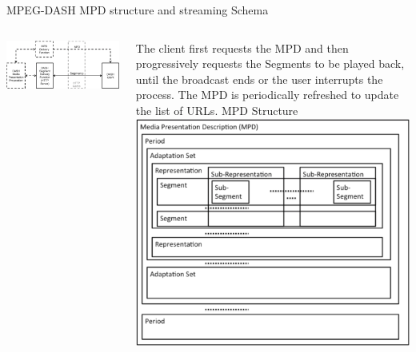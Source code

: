 \documentclass[10pt]{beamer}
\begin{document}
\begin{frame}[fragile]{MPEG-DASH MPD structure and streaming Schema}
\begin{columns}
        	\centering
            \includegraphics[width=\textwidth]{img/DASH_schema}
            \vspace*{0.5cm}
            \raggedright The client first requests the MPD and then progressively requests the Segments to be played back, until the broadcast ends or the user interrupts the process. The MPD is periodically refreshed to update the list of URLs.
        	\centering
            MPD Structure\vspace*{0.25cm}
            \includegraphics[width=\textwidth]{img/MPD}
\end{columns}
\end{frame}
\end{document}
